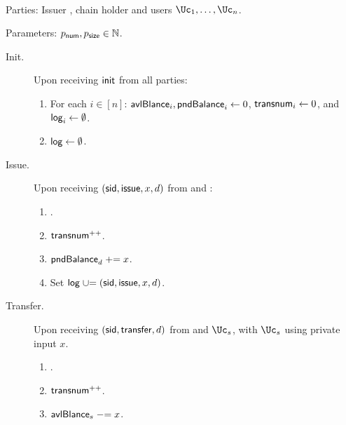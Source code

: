 \begin{functionality}\label{func:ConfidentialTransactions}~
	
	
	
	\item[Parties:]	Issuer \Ic, chain holder  \Cc and users  $\Uc_1, 
	\ldots,\Uc_n$.
	
	
	\item[Parameters:] $p_{\mathsf{num}},p_{\mathsf{size}} \in {\mathbb{N}}$.
	
	
	\begin{description}
		\item[Init.] Upon receiving $\mathsf{init}$ from  all parties: 
		\begin{enumerate}
			\item  For each $i\in [n]$:  $\mathsf{avlBlance}_i,\mathsf{pndBalance}_i \leftarrow 0$, $\mathsf{transnum}_i \leftarrow 0$, and  $\mathsf{log}_i \leftarrow \emptyset$.
			
			\item  $\mathsf{log} \leftarrow \emptyset$.
		\end{enumerate}
		
			\item[Issue.]   Upon receiving $(\mathsf{sid},\mathsf{issue},x,d)$ from  \Cc and \Ic:
		\begin{enumerate}
			
			
			\item {}.
			
			\item $\mathsf{transnum}^{++}$.
			
			\item $\mathsf{pndBalance}_d \mathrel{+}= x$.
			
			\item Set $\mathsf{log} \mathrel{\cup}= {(\mathsf{sid},\mathsf{issue},x,d)}$.
		\end{enumerate}
		
		
		\item[Transfer.]    Upon receiving  $(\mathsf{sid},\mathsf{transfer},d)$ from  \Cc and  $\Uc_s$, with  $\Uc_s$ using private input $x$. 
		
	
		\begin{enumerate}
			\item {}.
			
				\item $\mathsf{transnum}^{++}$.
				
				
			\item $\mathsf{avlBlance}_s \mathrel{-}= x$.
			

\end{enumerate}
\end{description}
\end{functionality}

